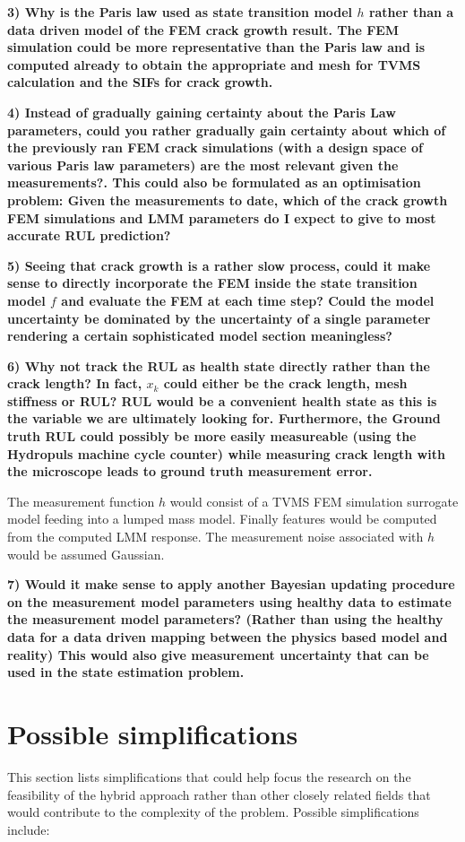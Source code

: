\textbf{3) Why is the Paris law used as state transition model $h$ rather than a data driven model of the FEM crack growth result. The FEM simulation could be more representative than the Paris law and is computed already to obtain the appropriate and mesh for TVMS calculation and the SIFs for crack growth.}

\textbf{4) Instead of gradually gaining certainty about the Paris Law parameters, could you rather gradually gain certainty about which of the previously ran FEM crack simulations (with a design space of various Paris law parameters) are the most relevant given the measurements?. This could also be formulated as an optimisation problem: Given the measurements to date, which of the crack growth FEM simulations and LMM parameters do I expect to give to most accurate RUL prediction?}

\textbf{5) Seeing that crack growth is a rather slow process, could it make sense to directly incorporate the FEM inside the state transition model $f$ and evaluate the FEM at each time step? Could the model uncertainty be dominated by the uncertainty of a single parameter rendering a certain sophisticated model section meaningless?}

\textbf{6) Why not track the RUL as health state directly rather than the crack length? In fact, $x_{k}$ could either be the crack length, mesh stiffness or RUL? RUL would be a convenient health state as this is the variable we are ultimately looking for. Furthermore, the Ground truth RUL could possibly be more easily measureable (using the Hydropuls machine cycle counter) while measuring crack length with the microscope leads to ground truth measurement error.}
	

The measurement function $h$ would consist of a TVMS FEM simulation surrogate model feeding into a lumped mass model. Finally features would be computed from the computed LMM response. The measurement noise associated with $h$ would be assumed Gaussian. 

\textbf{7) Would it make sense to apply another Bayesian updating procedure on the measurement model parameters using healthy data to estimate the measurement model parameters? (Rather than using the healthy data for a data driven mapping between the physics based model and reality) This would also give measurement uncertainty that can be used in the state estimation problem.}




\section{Possible simplifications}
This section lists simplifications that could help focus the research on the feasibility of the hybrid approach rather than other closely related fields that would contribute to the complexity of the problem. Possible simplifications include:

